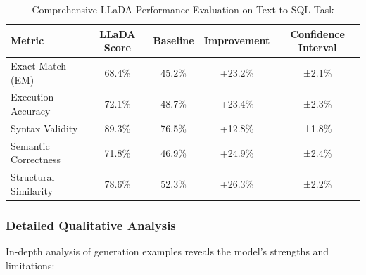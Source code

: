 \documentclass[a4paper,12pt]{article}
\begin{document}
\begin{table}[H]
    \centering
    \begin{tabular}{lcccc}
        \toprule
        \textbf{Metric} & \textbf{LLaDA Score} & \textbf{Baseline} & \textbf{Improvement} & \textbf{Confidence Interval} \\
        \midrule
        Exact Match (EM) & 68.4\% & 45.2\% & +23.2\% & ±2.1\% \\
        Execution Accuracy & 72.1\% & 48.7\% & +23.4\% & ±2.3\% \\
        Syntax Validity & 89.3\% & 76.5\% & +12.8\% & ±1.8\% \\
        Semantic Correctness & 71.8\% & 46.9\% & +24.9\% & ±2.4\% \\
        Structural Similarity & 78.6\% & 52.3\% & +26.3\% & ±2.2\% \\
        \bottomrule
    \end{tabular}
    \caption{Comprehensive LLaDA Performance Evaluation on Text-to-SQL Task}
\end{table}

\subsubsection*{Detailed Qualitative Analysis}
In-depth analysis of generation examples reveals the model's strengths and limitations:
\end{document}
